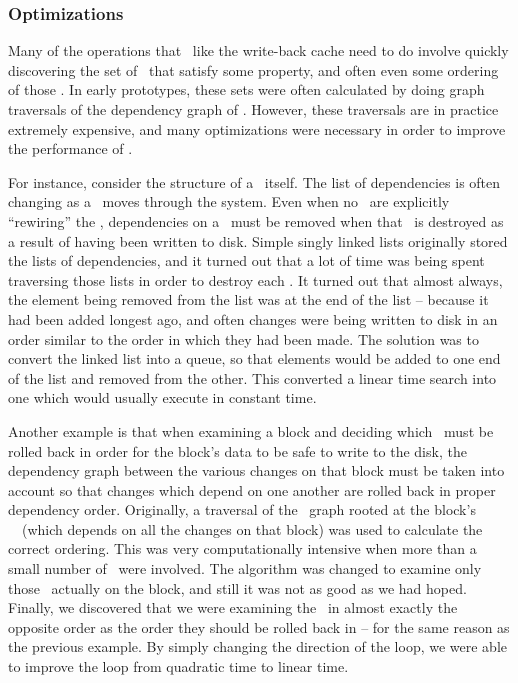\subsubsection {Optimizations}
Many of the operations that \modules\ like the write-back cache need to do
involve quickly discovering the set of \chdescs\ that satisfy some property,
and often even some ordering of those \chdescs. In early prototypes, these sets
were often calculated by doing graph traversals of the dependency graph of
\chdescs. However, these traversals are in practice extremely expensive, and
many optimizations were necessary in order to improve the performance of
\Kudos.

For instance, consider the structure of a \chdesc\ itself. The list of
dependencies is often changing as a \chdesc\ moves through the system. Even
when no \modules\ are explicitly ``rewiring'' the \chdescs, dependencies on a
\chdesc\ must be removed when that \chdesc\ is destroyed as a result of having
been written to disk. Simple singly linked lists originally stored the lists of
dependencies, and it turned out that a lot of time was being spent traversing
those lists in order to destroy each \chdesc. It turned out that almost always,
the element being removed from the list was at the end of the list -- because
it had been added longest ago, and often changes were being written to disk in
an order similar to the order in which they had been made. The solution was to
convert the linked list into a queue, so that elements would be added to one
end of the list and removed from the other. This converted a linear time search
into one which would usually execute in constant time.

Another example is that when examining a block and deciding which \chdescs\ must
be rolled back in order for the block's data to be safe to write to the disk,
the dependency graph between the various changes on that block must be taken
into account so that changes which depend on one another are rolled back in
proper dependency order. Originally, a traversal of the \chdesc\ graph rooted at
the block's \noop\ \chdesc\ (which depends on all the changes on that block) was
used to calculate the correct ordering. This was very computationally intensive
when more than a small number of \chdescs\ were involved. The algorithm was
changed to examine only those \chdescs\ actually on the block, and still it was
not as good as we had hoped. Finally, we discovered that we were examining the
\chdescs\ in almost exactly the opposite order as the order they should be
rolled back in -- for the same reason as the previous example. By simply
changing the direction of the loop, we were able to improve the loop from
quadratic time to linear time.

